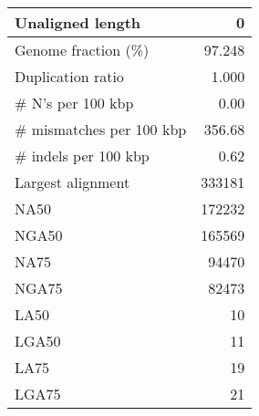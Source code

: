 \documentclass[12pt,a4paper]{article}
\begin{document}
\begin{table}[ht]
\begin{center}
\begin{tabular}{|l*{1}{|r}|}
Unaligned length & 0 \\ \hline
Genome fraction (\%) & 97.248 \\ \hline
Duplication ratio & 1.000 \\ \hline
\# N's per 100 kbp & 0.00 \\ \hline
\# mismatches per 100 kbp & 356.68 \\ \hline
\# indels per 100 kbp & 0.62 \\ \hline
Largest alignment & 333181 \\ \hline
NA50 & 172232 \\ \hline
NGA50 & 165569 \\ \hline
NA75 & 94470 \\ \hline
NGA75 & 82473 \\ \hline
LA50 & 10 \\ \hline
LGA50 & 11 \\ \hline
LA75 & 19 \\ \hline
LGA75 & 21 \\ \hline
\end{tabular}
\end{center}
\end{table}
\end{document}
